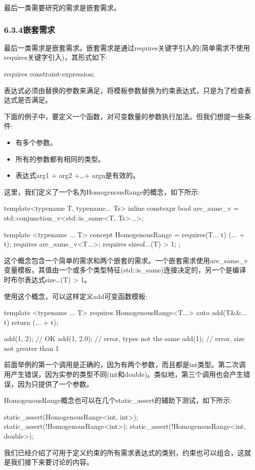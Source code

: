 最后一类需要研究的需求是嵌套需求。

\subsubsection{6.3.4\hspace{0.2cm}嵌套需求}

最后一类需求是嵌套需求。嵌套需求是通过requires关键字引入的(简单需求不使用requires关键字引入)，其形式如下:

\begin{cpp}
requires constraint-expression;
\end{cpp}

表达式必须由替换的参数来满足，将模板参数替换为约束表达式，只是为了检查表达式是否满足。

下面的例子中，要定义一个函数，对可变数量的参数执行加法。但我们想提一些条件:

\begin{itemize}
\item
有多个参数。

\item
所有的参数都有相同的类型。

\item
表达式arg1 + arg2 +…+ argn是有效的。
\end{itemize}

这里，我们定义了一个名为HomogenousRange的概念，如下所示:

\begin{cpp}
template<typename T, typename... Ts>
inline constexpr bool are_same_v =
	std::conjunction_v<std::is_same<T, Ts>...>;
	
template <typename ... T>
concept HomogenousRange = requires(T... t)
{
	(... + t);
	requires are_same_v<T...>;
	requires sizeof...(T) > 1;
};
\end{cpp}

这个概念包含一个简单的需求和两个嵌套的需求。一个嵌套需求使用are\_same\_v变量模板，其值由一个或多个类型特征(std::is\_same)连接决定的，另一个是编译时布尔表达式size…(T) > 1。

使用这个概念，可以这样定义add可变函数模板:

\begin{cpp}
template <typename ... T>
requires HomogenousRange<T...>
auto add(T&&... t)
{
	return (... + t);
}

add(1, 2); // OK
add(1, 2.0); // error, types not the same
add(1); // error, size not greater than 1
\end{cpp}

前面举例的第一个调用是正确的，因为有两个参数，而且都是int类型。第二次调用产生错误，因为实参的类型不同(int和double)。类似地，第三个调用也会产生错误，因为只提供了一个参数。

HomogenousRange概念也可以在几个static\_assert的辅助下测试，如下所示:

\begin{cpp}
static_assert(HomogenousRange<int, int>);
static_assert(!HomogenousRange<int>);
static_assert(!HomogenousRange<int, double>);
\end{cpp}

我们已经介绍了可用于定义约束的所有需求表达式的类别，约束也可以组合，这就是我们接下来要讨论的内容。
















